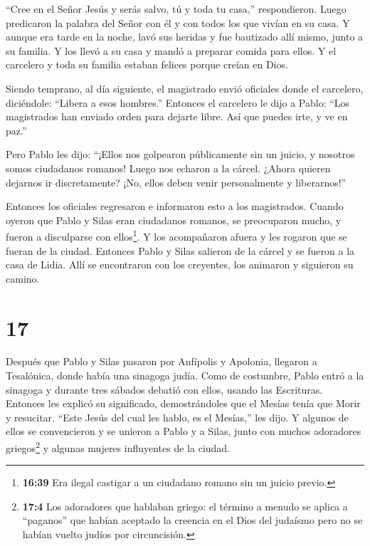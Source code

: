 ``Cree en el Señor Jesús y serás salvo, tú y toda tu
casa,'' respondieron.  Luego predicaron la palabra del
Señor con él y con todos los que vivían en su casa.  Y
aunque era tarde en la noche, lavó sus heridas y fue bautizado allí
mismo, junto a su familia.  Y los llevó a su casa y mandó a
preparar comida para ellos. Y el carcelero y toda su familia estaban
felices porque creían en Dios.

 Siendo temprano, al día siguiente, el magistrado envió
oficiales donde el carcelero, diciéndole: ``Libera a esos hombres.''
 Entonces el carcelero le dijo a Pablo: ``Los magistrados
han enviado orden para dejarte libre. Así que puedes irte, y ve en
paz.''

 Pero Pablo les dijo: ``¡Ellos nos golpearon públicamente
sin un juicio, y nosotros somos ciudadanos romanos! Luego nos echaron a
la cárcel. ¿Ahora quieren dejarnos ir discretamente? ¡No, ellos deben
venir personalmente y liberarnos!''

 Entonces los oficiales regresaron e informaron esto a los
magistrados. Cuando oyeron que Pablo y Silas eran ciudadanos romanos, se
preocuparon mucho,  y fueron a disculparse con
ellos\footnote{\textbf{16:39} Era ilegal castigar a un ciudadano romano
  sin un juicio previo.}. Y los acompañaron afuera y les rogaron que se
fueran de la ciudad.  Entonces Pablo y Silas salieron de la
cárcel y se fueron a la casa de Lidia. Allí se encontraron con los
creyentes, los animaron y siguieron su camino.

\hypertarget{section-16}{%
\section{17}\label{section-16}}

 Después que Pablo y Silas pasaron por Anfípolis y Apolonia,
llegaron a Tesalónica, donde había una sinagoga judía.  Como
de costumbre, Pablo entró a la sinagoga y durante tres sábados debatió
con ellos, usando las Escrituras.  Entonces les explicó su
significado, demostrándoles que el Mesías tenía que Morir y resucitar.
``Este Jesús del cual les hablo, es el Mesías,'' les dijo. 
Y algunos de ellos se convencieron y se unieron a Pablo y a Silas, junto
con muchos adoradores griegos\footnote{\textbf{17:4} Los adoradores que
  hablaban griego: el término a menudo se aplica a ``paganos'' que
  habían aceptado la creencia en el Dios del judaísmo pero no se habían
  vuelto judíos por circuncisión.} y algunas mujeres influyentes de la
ciudad.

